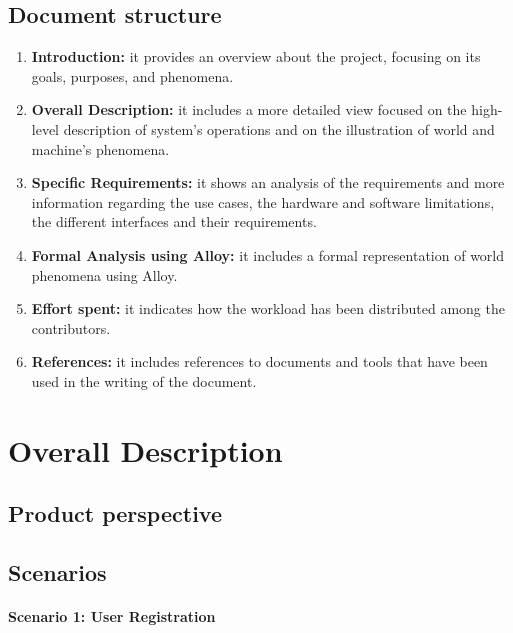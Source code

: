 \documentclass{Configuration_Files/PoliMi3i_thesis}
\begin{document}
\section{Document structure}
\begin{enumerate}
    \item \textbf{Introduction:} it provides an overview about the project, focusing on its goals, purposes, and phenomena.
    \item \textbf{Overall Description:} it includes a more detailed view focused on the high-level description of system's operations and on the illustration of world and machine's phenomena.
    \item \textbf{Specific Requirements:} it shows an analysis of the requirements and more information regarding the use cases, the hardware and software limitations, the different interfaces and their requirements.
    \item \textbf{Formal Analysis using Alloy:} it includes a formal representation of world phenomena using Alloy.
    \item \textbf{Effort spent:} it indicates how the workload has been distributed among the contributors.
    \item \textbf{References:} it includes references to documents and tools that have been used in the writing of the document. 
\end{enumerate}

\thispagestyle{empty}
\cleardoublepage





\chapter{Overall Description}


\section{Product perspective}


\section{Scenarios}

    \subsubsection*{Scenario 1: User Registration}
    
\end{document}
